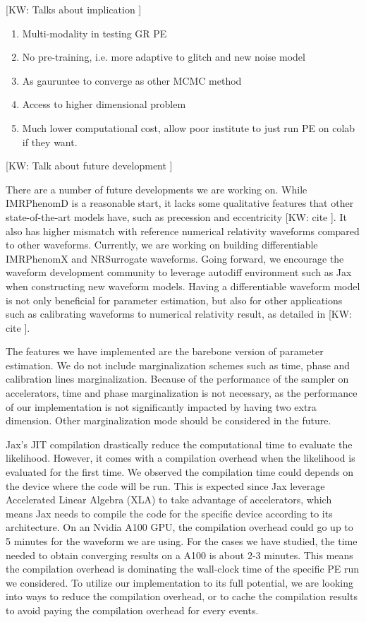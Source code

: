 \documentclass[twocolumn]{aastex631}
\newcommand{\kw}[1]{{\color{rb4}[KW: #1 ]}}
\begin{document}
\kw{Talks about implication}
\begin{enumerate}
    \item Multi-modality in testing GR PE
    \item No pre-training, i.e. more adaptive to glitch and new noise model
    \item As gauruntee to converge as other MCMC method
    \item Access to higher dimensional problem
    \item Much lower computational cost, allow poor institute to just run PE on colab if they want.
\end{enumerate}

\kw{Talk about future development}


There are a number of future developments we are working on.
While IMRPhenomD is a reasonable start, it lacks some qualitative features that other state-of-the-art models have,
such as precession and eccentricity \kw{cite}.
It also has higher mismatch with reference numerical relativity waveforms compared to other waveforms.
Currently, we are working on building differentiable IMRPhenomX and NRSurrogate waveforms.
Going forward, we encourage the waveform development community to leverage autodiff environment such as Jax when constructing new waveform models.
Having a differentiable waveform model is not only beneficial for parameter estimation, but also for other applications such as calibrating waveforms to numerical relativity result, as detailed in \kw{cite}.

The features we have implemented are the barebone version of parameter estimation.
We do not include marginalization schemes such as time, phase and calibration lines marginalization.
Because of the performance of the sampler on accelerators, time and phase marginalization is not necessary,
as the performance of our implementation is not significantly impacted by having two extra dimension.
Other marginalization mode should be considered in the future.

Jax's JIT compilation drastically reduce the computational time to evaluate the likelihood.
However, it comes with a compilation overhead when the likelihood is evaluated for the first time.
We observed the compilation time could depends on the device where the code will be run.
This is expected since Jax leverage Accelerated Linear Algebra (XLA) to take advantage of accelerators,
which means Jax needs to compile the code for the specific device according to its architecture.
On an Nvidia A100 GPU, the compilation overhead could go up to 5 minutes for the waveform we are using.
For the cases we have studied, the time needed to obtain converging results on a A100 is about 2-3 minutes.
This means the compilation overhead is dominating the wall-clock time of the specific PE run we considered.
To utilize our implementation to its full potential, we are looking into ways to reduce the compilation overhead,
or to cache the compilation results to avoid paying the compilation overhead for every events.
\end{document}
